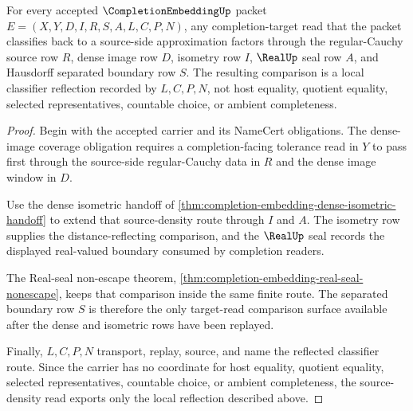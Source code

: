 \begin{theorem}
\label{thm:completion-embedding-source-density-reflection}
For every accepted $\CompletionEmbeddingUp$ packet $E=(X,Y,D,I,R,S,A,L,C,P,N)$, any completion-target read that the packet classifies back to a source-side approximation factors through the regular-Cauchy source row $R$, dense image row $D$, isometry row $I$, $\RealUp$ seal row $A$, and Hausdorff separated boundary row $S$. The resulting comparison is a local classifier reflection recorded by $L,C,P,N$, not host equality, quotient equality, selected representatives, countable choice, or ambient completeness.
\end{theorem}
\begin{proof}
Begin with the accepted carrier and its NameCert obligations. The dense-image coverage obligation requires a completion-facing tolerance read in $Y$ to pass first through the source-side regular-Cauchy data in $R$ and the dense image window in $D$.

Use the dense isometric handoff of \autoref{thm:completion-embedding-dense-isometric-handoff} to extend that source-density route through $I$ and $A$. The isometry row supplies the distance-reflecting comparison, and the $\RealUp$ seal records the displayed real-valued boundary consumed by completion readers.

The Real-seal non-escape theorem, \autoref{thm:completion-embedding-real-seal-nonescape}, keeps that comparison inside the same finite route. The separated boundary row $S$ is therefore the only target-read comparison surface available after the dense and isometric rows have been replayed.

Finally, $L,C,P,N$ transport, replay, source, and name the reflected classifier route. Since the carrier has no coordinate for host equality, quotient equality, selected representatives, countable choice, or ambient completeness, the source-density read exports only the local reflection described above.
\end{proof}

